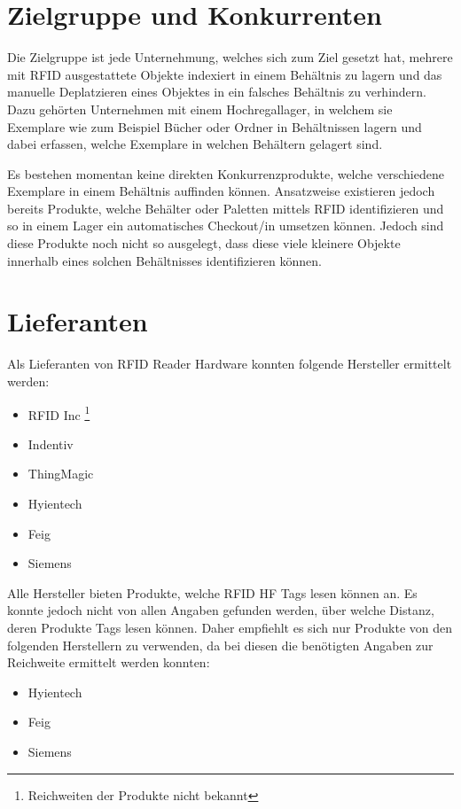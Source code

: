 \section{Zielgruppe und Konkurrenten}
Die Zielgruppe ist jede Unternehmung, welches sich zum Ziel gesetzt hat, mehrere mit RFID ausgestattete Objekte indexiert in einem Behältnis zu lagern und das manuelle Deplatzieren eines Objektes in ein falsches Behältnis zu verhindern.
Dazu gehörten Unternehmen mit einem Hochregallager, in welchem sie Exemplare wie zum Beispiel Bücher oder Ordner in Behältnissen lagern und dabei erfassen, welche Exemplare in welchen Behältern gelagert sind.

Es bestehen momentan keine direkten Konkurrenzprodukte, welche verschiedene Exemplare in einem Behältnis auffinden können. Ansatzweise existieren jedoch bereits Produkte, welche  Behälter oder Paletten mittels RFID identifizieren und so in einem Lager ein automatisches Checkout/in umsetzen können. Jedoch sind diese Produkte noch nicht so ausgelegt, dass diese viele kleinere Objekte innerhalb eines solchen Behältnisses identifizieren können.

\section{Lieferanten}
Als Lieferanten von RFID Reader Hardware konnten folgende Hersteller ermittelt werden:
\renewcommand*{\thefootnote}{\fnsymbol{footnote}}
\begin{itemize}
	\item RFID Inc \footnote[1]{\label{note:range_unknown}Reichweiten der Produkte nicht bekannt}
	\item Indentiv \hyperref[note:range_unknown]{\footnotemark[1]}
	\item ThingMagic \hyperref[note:range_unknown]{\footnotemark[1]}
	\item Hyientech
	\item Feig
	\item Siemens
\end{itemize}
\renewcommand*{\thefootnote}{\arabic{footnote}}

Alle Hersteller bieten Produkte, welche RFID HF Tags lesen können an. Es konnte jedoch nicht von allen Angaben gefunden werden, über welche Distanz, deren Produkte Tags lesen können. Daher empfiehlt es sich nur Produkte von den folgenden Herstellern zu verwenden, da bei diesen die benötigten Angaben zur Reichweite ermittelt werden konnten:

\begin{itemize}
	\item Hyientech
	\item Feig
	\item Siemens
\end{itemize}

